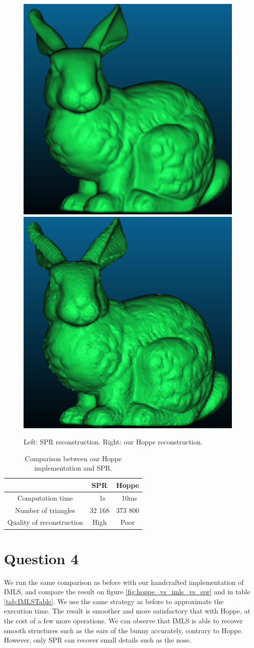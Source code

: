 \documentclass[a4paper]{article}
\begin{document}
\begin{figure}[ht]
  \centering
  \includegraphics[width=0.3\linewidth]{figures/SPR.png}
  \includegraphics[width=0.3\linewidth]{figures/Hoppe.png}
  \caption{Left: SPR reconstruction. Right: our Hoppe reconstruction.}
  \label{fig:hoppe_vs_spr}
\end{figure}

\begin{table}
    \centering
    \begin{tabular}{|c|c|c|}
      \hline
         & SPR & Hoppe \\
      \hline
      Computation time & ~ 1s & ~10ms \\
      Number of triangles & 32 168 & 373 800 \\
      Quality of reconstruction & High & Poor \\
      \hline
    \end{tabular}
    \caption{Comparison between our Hoppe implementation and SPR.}
    \label{tab:HoppeTable}
  \end{table}

\section*{Question 4}
We run the same comparison as before with our handcrafted implementation of IMLS,
and compare the result on figure \ref{fig:hoppe_vs_imls_vs_spr} and in table \ref{tab:IMLSTable}. We use
the same strategy as before to approximate the execution time. The result is
smoother and more satisfactory that with Hoppe, at the cost of a few
more operations. We can observe that IMLS is able to recover smooth structures such
as the ears of the bunny accurately, contrary to Hoppe. However, only SPR can recover small details
such as the nose.
\end{document}
